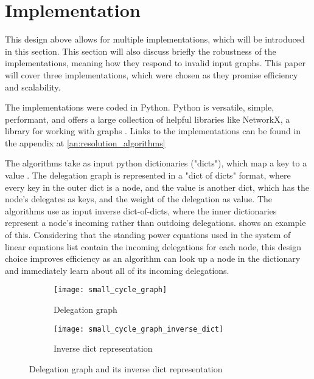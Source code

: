 \graphicspath{{./figures/}}

\chapter{Implementation}
\label{chap:implementation}

This design above allows for multiple implementations, which will be introduced in this section. This section will also discuss briefly the robustness of the implementations, meaning how they respond to invalid input graphs. This paper will cover three implementations, which were chosen as they promise efficiency and scalability.

The implementations were coded in Python. Python is versatile, simple, performant, and offers a large collection of helpful libraries like NetworkX, a library for working with graphs \cite{hagbergExploringNetworkStructure2008}. Links to the implementations can be found in the appendix at \cref{an:resolution_algorithms}

The algorithms take as input python dictionaries ("dicts"), which map a key to a value \cite{pythonsoftwarefoundationPythonTutorialSection}. The delegation graph is represented in a "dict of dicts" format, where every key in the outer dict is a node, and the value is another dict, which has the node's delegates as keys, and the weight of the delegation as value. The algorithms use as input inverse dict-of-dicts, where the inner dictionaries represent a node's incoming rather than outdoing delegations.  shows an example of this. Considering that the standing power equations used in the system of linear equations list contain the incoming delegations for each node, this design choice improves efficiency as an algorithm can look up a node in the dictionary and immediately learn about all of its incoming delegations.

\begin{figure}[t]
    \centering
    \begin{subfigure}[t]{0.45\textwidth}
        \centering
        \texttt{[image: small\_cycle\_graph]}
        \caption{Delegation graph}
    \end{subfigure}
    \hfill
    \begin{subfigure}[t]{0.45\textwidth}
        \centering
        \texttt{[image: small\_cycle\_graph\_inverse\_dict]}
        \caption{Inverse dict representation}
    \end{subfigure}
    \caption{Delegation graph and its inverse dict representation}
    \label{fig:inverse_dict_example}
\end{figure}

